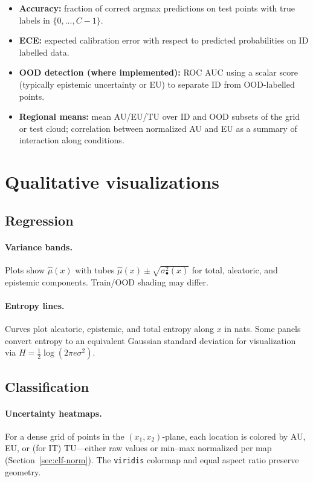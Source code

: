 \begin{itemize}
  \item \textbf{Accuracy:} fraction of correct argmax predictions on test points with true labels in $\{0,\ldots,C-1\}$.
  \item \textbf{ECE:} expected calibration error with respect to predicted probabilities on ID labelled data.
  \item \textbf{OOD detection (where implemented):} ROC AUC using a scalar score (typically epistemic uncertainty or EU) to separate ID from OOD-labelled points.
  \item \textbf{Regional means:} mean AU/EU/TU over ID and OOD subsets of the grid or test cloud; correlation between normalized AU and EU as a summary of interaction along conditions.
\end{itemize}

\section{Qualitative visualizations}
\label{sec:qual-plots}

\subsection{Regression}

\paragraph{Variance bands.}
Plots show $\hat{\mu}(x)$ with tubes $\hat{\mu}(x)\pm\sqrt{\sigma^2_{\bullet}(x)}$ for total, aleatoric, and epistemic components. Train/OOD shading may differ.

\paragraph{Entropy lines.}
Curves plot aleatoric, epistemic, and total entropy along $x$ in nats. Some panels convert entropy to an equivalent Gaussian standard deviation for visualization via $H=\tfrac{1}{2}\log(2\pi e\sigma^2)$.

\subsection{Classification}

\paragraph{Uncertainty heatmaps.}
For a dense grid of points in the $(x_1,x_2)$-plane, each location is colored by AU, EU, or (for IT) TU---either raw values or min--max normalized per map (Section~\ref{sec:clf-norm}). The \texttt{viridis} colormap and equal aspect ratio preserve geometry.

